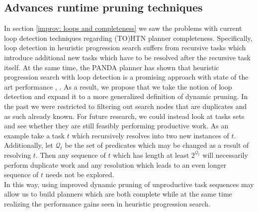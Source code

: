 \subsection{Advances runtime pruning techniques}
In section \ref{improv: loops and completeness} we saw the problems with current loop detection techniques regarding (TO)HTN planner completeness. Specifically, loop detection in heuristic progression search suffers from recursive tasks which introduce additional new tasks which have to be resolved after the recursive task itself. At the same time, the PANDA planner has shown that heuristic progression search with loop detection is a promising approach with state of the art performance \cite{holler2020htn}, \cite{holler2021loop}. As a result, we propose that we take the notion of loop detection and expand it to a more generalized definition of dynamic pruning. In the past we were restricted to filtering out search nodes that are duplicates and as such already known. For future research, we could instead look at tasks sets and see whether they are still feasibly performing productive work. As an example take a task $t$ which recursively resolves into two new instances of $t$. Additionally, let $\mathcal{Q}_t$ be the set of predicates which may be changed as a result of resolving $t$. Then any sequence of $t$ which has length at least $2^{\mathcal{Q}_t}$ will necessarily perform duplicate work and any resolution which leads to an even longer sequence of $t$ needs not be explored. \\
In this way, using improved dynamic pruning of unproductive task sequences may allow us to build planners which are both complete while at the same time realizing the performance gains seen in heuristic progression search.
\begin{comment}
- some planners are known to not be complete
- some planners can easily be shown to be complete
- we make a case in section \todo{Ref where we destroy our own heuristic and PANDA} that heuristic planners may not be complete
- to catch these cases planners may have to get more intelligent about which parts of the search space to cut off
- else we may have to adapt our search algorithms to enforce completeness at another level
- similarly we may achieve completeness by simply cutting off the search once we get too deep \todo{cite exponential max depth}
- however, this may be theoretically complete but also hits us with the full expense of an EXPSPACE-hard problem, i.e. we may never realistically reach this condition (except on very small problems)
- similarly it is not clear whether an algorithm like heuristic + plan length search gives us completeness in feasible time or more theoretically \todo{Compare with results once they arrive}
- HyperTensioN, a decidedly non-complete planner is also the best-rated planner in the IPC 2020
- maybe we need to have a full conversation on how much completeness we actually want/ need (or two separate categories of planners between 'HTN as a way to provide advice into planning domains \todo{quote Erol, I think?}' and 'HTN for the full power it provides')

- new loop detection techniques leading to planner completeness
\end{comment}


